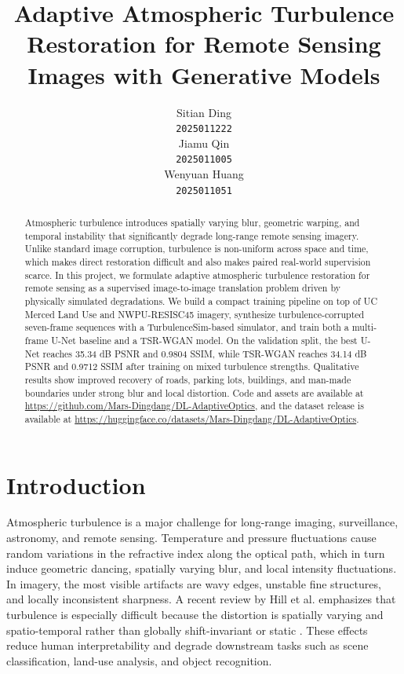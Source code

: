 \documentclass{article}
\title{Adaptive Atmospheric Turbulence Restoration for Remote Sensing Images with Generative Models}
\author{%
  Sitian Ding \\
  \texttt{2025011222} \\
  \And
  Jiamu Qin \\
  \texttt{2025011005} \\
  \And
  Wenyuan Huang \\
  \texttt{2025011051} \\
}
\begin{document}
\maketitle

\begin{abstract}
Atmospheric turbulence introduces spatially varying blur, geometric warping, and temporal instability that significantly degrade long-range remote sensing imagery. Unlike standard image corruption, turbulence is non-uniform across space and time, which makes direct restoration difficult and also makes paired real-world supervision scarce. In this project, we formulate adaptive atmospheric turbulence restoration for remote sensing as a supervised image-to-image translation problem driven by physically simulated degradations. We build a compact training pipeline on top of UC Merced Land Use and NWPU-RESISC45 imagery, synthesize turbulence-corrupted seven-frame sequences with a TurbulenceSim-based simulator, and train both a multi-frame U-Net baseline and a TSR-WGAN model. On the validation split, the best U-Net reaches 35.34 dB PSNR and 0.9804 SSIM, while TSR-WGAN reaches 34.14 dB PSNR and 0.9712 SSIM after training on mixed turbulence strengths. Qualitative results show improved recovery of roads, parking lots, buildings, and man-made boundaries under strong blur and local distortion. Code and assets are available at \url{https://github.com/Mars-Dingdang/DL-AdaptiveOptics}, and the dataset release is available at \url{https://huggingface.co/datasets/Mars-Dingdang/DL-AdaptiveOptics}.
\end{abstract}

\section{Introduction}
Atmospheric turbulence is a major challenge for long-range imaging, surveillance, astronomy, and remote sensing. Temperature and pressure fluctuations cause random variations in the refractive index along the optical path, which in turn induce geometric dancing, spatially varying blur, and local intensity fluctuations. In imagery, the most visible artifacts are wavy edges, unstable fine structures, and locally inconsistent sharpness. A recent review by Hill et al. emphasizes that turbulence is especially difficult because the distortion is spatially varying and spatio-temporal rather than globally shift-invariant or static \citep{hill2024review}. These effects reduce human interpretability and degrade downstream tasks such as scene classification, land-use analysis, and object recognition. 
\end{document}
